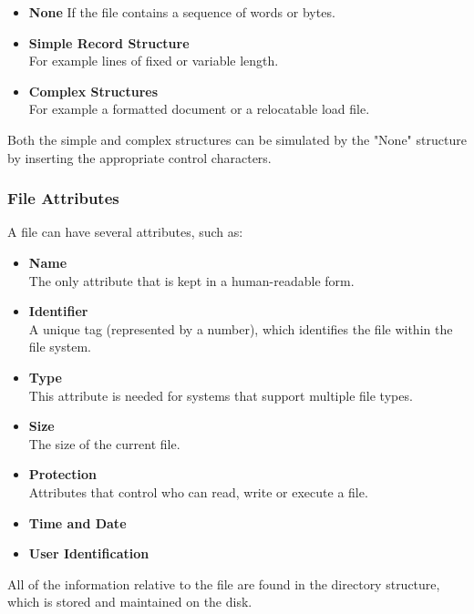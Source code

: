 \documentclass{article}
\begin{document}
\begin{itemize}
	\item \textbf{None}
	If the file contains a sequence of words or bytes.
	
	\item \textbf{Simple Record Structure}
	\vspace{.2cm} \\
	For example lines of fixed or variable length.
	
	\item \textbf{Complex Structures}
	\vspace{.2cm} \\
	For example a formatted document or a relocatable load file.
\end{itemize}
Both the simple and complex structures can be simulated by the "None" structure by inserting the appropriate control characters.

\subsubsection{File Attributes}
A file can have several attributes, such as:

\begin{itemize}
	\item \textbf{Name}
	\vspace{.2cm} \\
	The only attribute that is kept in a human-readable form.
	
	\item \textbf{Identifier}
	\vspace{.2cm} \\
	A unique tag (represented by a number), which identifies the file within the file system.
	
	\item \textbf{Type}
	\vspace{.2cm} \\
	This attribute is needed for systems that support multiple file types.
	
	\item \textbf{Size}
	\vspace{.2cm} \\
	The size of the current file.
	
	\item \textbf{Protection}
	\vspace{.2cm} \\	
	Attributes that control who can read, write or execute a file.
	
	\item \textbf{Time and Date}
	
	\item \textbf{User Identification}
\end{itemize}
All of the information relative to the file are found in the directory structure, which is stored and maintained on the disk.
\end{document}
